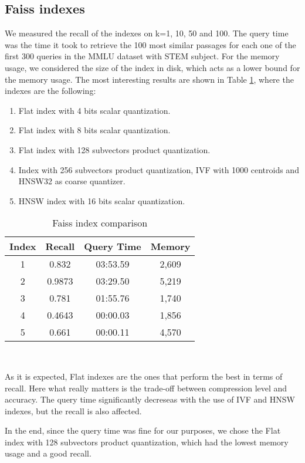 \documentclass[11pt]{article}
\begin{document}
\subsection{Faiss indexes}

We measured the recall of the indexes on k=1, 10, 50 and 100. The query time was 
the time it took to retrieve the 100 most similar passages for each one of the first 300
queries in the MMLU dataset with STEM subject. 
For the memory usage, we considered the size of the index in disk, which acts as a lower
bound for the memory usage.
The most interesting results are shown in Table \ref{tab:faiss-index}, where the indexes 
are the following:

\begin{enumerate}
    \item Flat index with 4 bits scalar quantization.
    \item Flat index with 8 bits scalar quantization.
    \item Flat index with 128 subvectors product quantization. 
    \item Index with 256 subvectors product quantization, IVF with 1000 centroids
    and HNSW32 as coarse quantizer.
    \item HNSW index with 16 bits scalar quantization.
\end{enumerate}

\begin{table}[h]
\centering
\begin{tabular}{|c|c|c|c|}
\hline
Index & Recall & Query Time & Memory \\
\hline
1 & 0.832 & 03:53.59 & 2,609 \\
2 & 0.9873 & 03:29.50 & 5,219 \\
3 & 0.781 & 01:55.76 & 1,740 \\
4 & 0.4643 & 00:00.03 & 1,856 \\
5 & 0.661 & 00:00.11 & 4,570 \\
\hline
\end{tabular}
\caption{Faiss index comparison}
\
\label{tab:faiss-index}
\end{table}

As it is expected, Flat indexes are the ones that perform the best in terms of recall.
Here what really matters is the trade-off between compression level and accuracy.
The query time significantly decreseas with the use of IVF and HNSW indexes, but the recall
is also affected.

In the end, since the query time was fine for our purposes, we chose the Flat index with 128
subvectors product quantization, which had the lowest memory usage and a good recall.
\end{document}
